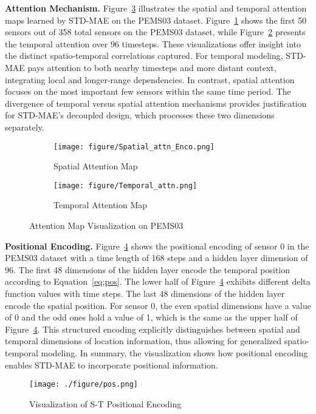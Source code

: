\documentclass[letterpaper]{article} \usepackage{aaai24}  \usepackage{times}  \usepackage{helvet}  \usepackage{courier}  \usepackage[hyphens]{url}  \usepackage{graphicx} \urlstyle{rm} \def\UrlFont{\rm}  \usepackage{natbib}  \usepackage{caption} \frenchspacing  \setlength{\pdfpagewidth}{8.5in} \setlength{\pdfpageheight}{11in} \usepackage{algorithm}
\begin{document}
\noindent\textbf{Attention Mechanism.} Figure~\ref{fig:case2} illustrates the spatial and temporal attention maps learned by STD-MAE on the PEMS03 dataset. Figure~\ref{case2-subfig1} shows the first 50 sensors out of 358 total sensors on the PEMS03 dataset, while Figure~\ref{case2-subfig2} presents the temporal attention over 96 timesteps. These visualizations offer insight into the distinct spatio-temporal correlations captured. For temporal modeling, STD-MAE pays attention to both nearby timesteps and more distant context, integrating local and longer-range dependencies. In contrast, spatial attention focuses on the most important few sensors within the same time period. The divergence of temporal versus spatial attention mechanisms provides justification for STD-MAE's decoupled design, which processes these two dimensions separately. \begin{figure}[h]
  \captionsetup{justification=centering}
  \centering
  \begin{subfigure}{0.22\textwidth}
    \texttt{[image: figure/Spatial\_attn\_Enco.png]}
    \caption{Spatial Attention Map}
    \label{case2-subfig1}
  \end{subfigure}
  \begin{subfigure}{0.23\textwidth}
    \texttt{[image: figure/Temporal\_attn.png]}
    \caption{Temporal Attention Map}
    \label{case2-subfig2}
  \end{subfigure}
  \captionsetup{justification=centering}
  \caption{Attention Map Visualization on PEMS03}
  \label{fig:case2}
\end{figure}

\noindent\textbf{Positional Encoding.} 
Figure~\ref{fig:pos} shows the positional encoding of sensor 0 in the PEMS03 dataset with a time length of 168 steps and a hidden layer dimension of 96. The first 48 dimensions of the hidden layer encode the temporal position according to Equation~\ref{eq:pos}. The lower half of Figure~\ref{fig:pos} exhibits different delta function values with time steps. The last 48 dimensions of the hidden layer encode the spatial position. For sensor 0, the even spatial dimensions have a value of 0 and the odd ones hold a value of 1, which is the same as the upper half of Figure~\ref{fig:pos}. This structured encoding explicitly distinguishes between spatial and temporal dimensions of location information, thus allowing for generalized spatio-temporal modeling. In summary, the visualization shows how positional encoding enables STD-MAE to incorporate positional information.
\begin{figure}[h]
	\centering
	\texttt{[image: ./figure/pos.png]}
	\captionsetup{justification=centering}
	\caption{Visualization of S-T Positional Encoding}
	\label{fig:pos}
\end{figure}
\end{document}
